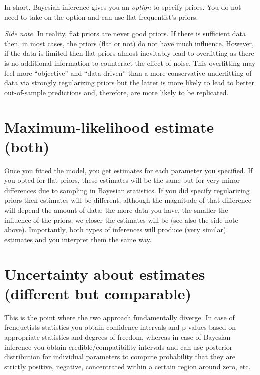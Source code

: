 \documentclass[
]{book}
\begin{document}
In short, Bayesian inference gives you an \emph{option} to specify priors. You do not need to take on the option and can use flat frequentist's priors.

\emph{Side note.} In reality, flat priors are never good priors. If there is sufficient data then, in most cases, the priors (flat or not) do not have much influence. However, if the data is limited then flat priors almost inevitably lead to overfitting as there is no additional information to counteract the effect of noise. This overfitting may feel more ``objective'' and ``data-driven'' than a more conservative underfitting of data via strongly regularizing priors but the latter is more likely to lead to better out-of-sample predictions and, therefore, are more likely to be replicated.

\hypertarget{maximum-likelihood-estimate-both}{%
\section{Maximum-likelihood estimate (both)}\label{maximum-likelihood-estimate-both}}

Once you fitted the model, you get estimates for each parameter you specified. If you opted for flat priors, these estimates will be the same but for very minor differences due to sampling in Bayesian statistics. If you did specify regularizing priors then estimates will be different, although the magnitude of that difference will depend the amount of data: the more data you have, the smaller the influence of the priors, we closer the estimates will be (see also the side note above). Importantly, both types of inferences will produce (very similar) estimates and you interpret them the same way.

\hypertarget{uncertainty-about-estimates-different-but-comparable}{%
\section{Uncertainty about estimates (different but comparable)}\label{uncertainty-about-estimates-different-but-comparable}}

This is the point where the two approach fundamentally diverge. In case of frenquetists statistics you obtain confidence intervals and p-values based on appropriate statistics and degrees of freedom, whereas in case of Bayesian inference you obtain credible/compatibility intervals and can use posterior distribution for individual parameters to compute probability that they are strictly positive, negative, concentrated within a certain region around zero, etc.
\end{document}
